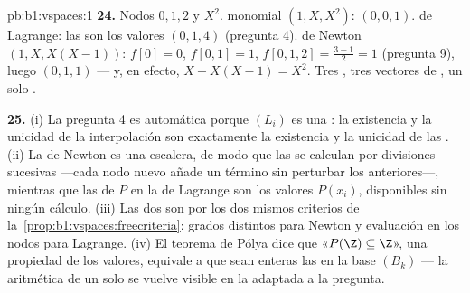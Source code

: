 \begin{solution}{pb:b1:vspaces:1}
\textbf{24.} Nodos $0, 1, 2$ y  $X^2$.  monomial
$(1, X, X^2)$:  $(0, 0, 1)$.  de Lagrange: las
 son los valores $(0, 1, 4)$ (pregunta 4).  de
Newton $(1, X, X(X-1))$:  $f[0] = 0$,
$f[0,1] = 1$, $f[0,1,2] = \frac{3 - 1}{2} = 1$ (pregunta 9), luego
 $(0, 1, 1)$ --- y, en efecto, $X + X(X-1) = X^2$. Tres
, tres vectores de , un solo .

\textbf{25.} (i) La pregunta 4 es automática porque $(L_i)$ es una
\emph{}: la existencia y la unicidad de la interpolación son
exactamente la existencia y la unicidad de las . (ii) La
 de Newton es una escalera, de modo que las  se
calculan por divisiones sucesivas ---cada nodo nuevo añade un término
sin perturbar los anteriores---, mientras que las  de $P$
en la de Lagrange son los valores $P(x_i)$, disponibles sin ningún
cálculo. (iii) Las dos  son  por los dos mismos criterios
de la~\cref{prop:b1:vspaces:freecriteria}: grados distintos para
Newton y evaluación en los nodos para Lagrange. (iv) El teorema de
Pólya dice que «$P(\Z) \subseteq \Z$», una propiedad de los valores,
equivale a que sean enteras las  en la base $(B_k)$ ---
la aritmética de un  solo se vuelve visible en la 
adaptada a la pregunta.
\end{solution}
